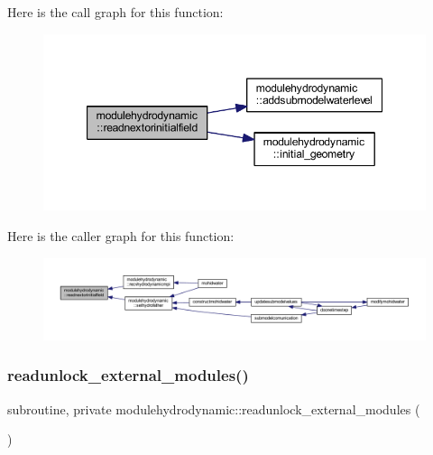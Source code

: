 Here is the call graph for this function\+:\nopagebreak
\begin{figure}[H]
\begin{center}
\leavevmode
\includegraphics[width=347pt]{namespacemodulehydrodynamic_af6d2413608971031e8650e99548abfc7_cgraph}
\end{center}
\end{figure}
Here is the caller graph for this function\+:\nopagebreak
\begin{figure}[H]
\begin{center}
\leavevmode
\includegraphics[width=350pt]{namespacemodulehydrodynamic_af6d2413608971031e8650e99548abfc7_icgraph}
\end{center}
\end{figure}
\mbox{\label{namespacemodulehydrodynamic_a6bb278dc4ab8e6429e5d7e752bd6347a}} 
\subsubsection{\texorpdfstring{readunlock\+\_\+external\+\_\+modules()}{readunlock\_external\_modules()}}
{\footnotesize\ttfamily subroutine, private modulehydrodynamic\+::readunlock\+\_\+external\+\_\+modules (\begin{DoxyParamCaption}{ }\end{DoxyParamCaption})\hspace{0.3cm}{\ttfamily [private]}}

